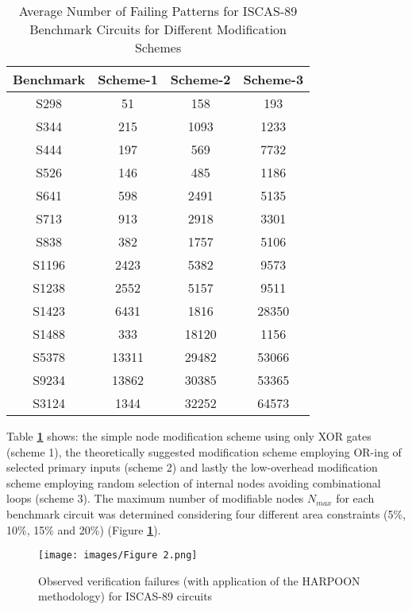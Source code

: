 \documentclass{optica-article}
\begin{document}
\begin{table}[H]
    \centering
    \caption{Average Number of Failing Patterns for ISCAS-89 Benchmark Circuits for Different Modification Schemes}
    \begin{tabular}{|c|c|c|c|}
        \hline
        Benchmark & Scheme-1 & Scheme-2 & Scheme-3 \\\hline
        S298 & 51 & 158 & 193 \\\hline
        S344 & 215 & 1093 & 1233 \\\hline
        S444 & 197 & 569 & 7732 \\\hline
        S526 & 146 & 485 & 1186 \\\hline
        S641 & 598 & 2491 & 5135 \\\hline
        S713 & 913 & 2918 & 3301 \\\hline
        S838 & 382 & 1757 & 5106 \\\hline
        S1196 & 2423 & 5382 & 9573 \\\hline
        S1238 & 2552 & 5157 & 9511 \\\hline
        S1423 & 6431 & 1816 & 28350 \\\hline
        S1488 & 333 & 18120 & 1156 \\\hline
        S5378 & 13311 & 29482 & 53066 \\\hline
        S9234 & 13862 & 30385 & 53365 \\\hline
        S3124 & 1344 & 32252 & 64573 \\\hline
    \end{tabular}
    \label{tab:Table 1}
\end{table}


Table \textbf{\ref{tab:Table 1}} shows: the simple node modification scheme using only XOR gates (scheme 1), the theoretically suggested modification scheme employing OR-ing of selected primary inputs (scheme 2) and lastly the low-overhead modification scheme employing random selection of internal nodes avoiding combinational loops (scheme 3). The maximum number of modifiable nodes $N_{max}$ for each benchmark circuit was determined considering four different area constraints (5\%, 10\%, 15\% and 20\%) (Figure \textbf{\ref{fig:Figure 2}}).


\begin{figure}[H]
    \centering
    \texttt{[image: images/Figure 2.png]}
    \caption{Observed verification failures (with application of the HARPOON methodology) for ISCAS-89 circuits}
    \label{fig:Figure 2}
\end{figure}
\end{document}
